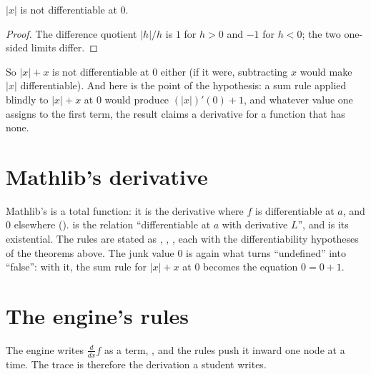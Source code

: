 \begin{theorem}
  $|x|$ is not differentiable at $0$.
\end{theorem}
\begin{proof}
  The difference quotient $|h|/h$ is $1$ for $h > 0$ and $-1$ for $h < 0$; the two one-sided
  limits differ.
\end{proof}

So $|x| + x$ is not differentiable at $0$ either (if it were, subtracting $x$ would make $|x|$
differentiable). And here is the point of the hypothesis: a sum rule applied blindly to
$|x| + x$ at $0$ would produce $(|x|)'(0) + 1$, and whatever value one assigns to the first term,
the result claims a derivative for a function that has none.

\section{Mathlib's derivative}

Mathlib's  is a total function: it is the derivative where $f$ is differentiable
at $a$, and $0$ elsewhere ().  is
the relation ``differentiable at $a$ with derivative $L$'', and  is
its existential. The rules are stated as , ,
, each with the differentiability hypotheses of the theorems above. The junk
value $0$ is again what turns ``undefined'' into ``false'': with it, the sum rule for $|x| + x$
at $0$ becomes the equation $0 = 0 + 1$.

\section{The engine's rules}

The engine writes $\frac{d}{dx} f$ as a term, , and the rules push it
inward one node at a time. The trace is therefore the derivation a student writes.

